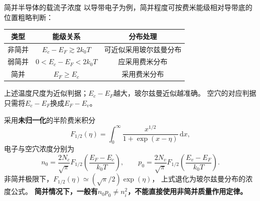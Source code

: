 \begin{theorem}{简并半导体的载流子浓度}
    以导带电子为例，简并程度可按费米能级相对导带底的位置粗略判断：
    \begin{center}
        \begin{tabular}{c c c}
            \hline
            类型 & 能级关系 & 分布处理 \\
            \hline
            非简并 & $E_c-E_F\gtrsim2k_0T$ & 可近似采用玻尔兹曼分布 \\
            弱简并 & $0<E_c-E_F<2k_0T$ & 应采用费米分布 \\
            简并 & $E_F\geq E_c$ & 采用费米分布 \\
            \hline
        \end{tabular}
    \end{center}
    上述温度尺度为近似判据；$E_c-E_F$越大，玻尔兹曼近似越准确。
    空穴的对应判据只需将$E_c-E_F$换成$E_F-E_v$。

    采用\textbf{未归一化}的半阶费米积分
    \[
    F_{1/2}(\eta)=\int_0^{\infty}
    \frac{x^{1/2}}{1+\exp(x-\eta)}\,\mathrm{d}x,
    \]
    电子与空穴浓度分别为
    \[
    \boxed{n_0=\frac{2N_c}{\sqrt{\pi}}
    F_{1/2}\!\left(\frac{E_F-E_c}{k_0T}\right)},
    \qquad
    \boxed{p_0=\frac{2N_v}{\sqrt{\pi}}
    F_{1/2}\!\left(\frac{E_v-E_F}{k_0T}\right)}.
    \]
    非简并极限下，$F_{1/2}(\eta)\simeq(\sqrt{\pi}/2)\exp(\eta)$，
    上式退化为玻尔兹曼分布的浓度公式。
    \textbf{简并情况下，一般有$n_0p_0\neq n_i^2$，不能直接使用非简并质量作用定律。}
\end{theorem}

